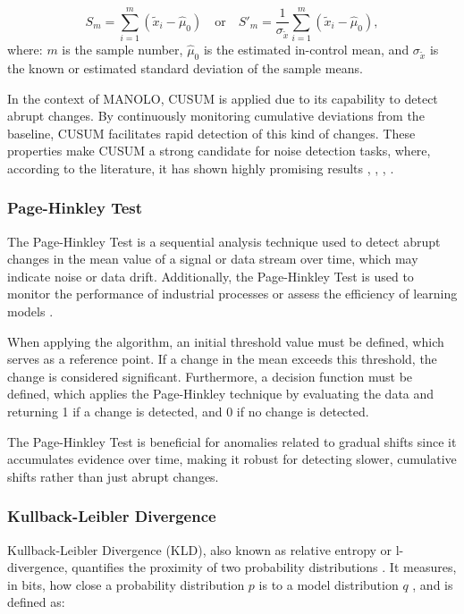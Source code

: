 \begin{equation}
S_m = \sum_{i=1}^{m} (\tilde{x}_i - \hat{\mu}_0) \quad \text{or} \quad S'_m = \frac{1}{\sigma_{\tilde{x}}} \sum_{i=1}^{m} (\tilde{x}_i - \hat{\mu}_0),
\end{equation}
where: $m$ is the sample number, $\hat{\mu}_0$ is the estimated in-control mean, and $\sigma_{\tilde{x}}$ is the known or estimated standard deviation of the sample means.

In the context of MANOLO, CUSUM is applied due to its capability to detect abrupt changes. By continuously monitoring cumulative deviations from the baseline, CUSUM facilitates rapid detection of this kind of changes.
These properties make CUSUM a strong candidate for noise detection tasks, where, according to the literature, it has shown highly promising results \cite{artyushenko2021modeling}, \cite{volovach2021detection}, \cite{tam2009theoretical}, \cite{yi2021adaptive}.

\subsubsection{Page-Hinkley Test}
The Page-Hinkley Test is a sequential analysis technique used to detect abrupt changes \cite{sebastiao2017supporting} in the mean value of a signal or data stream over time, which may indicate noise or data drift. Additionally, the Page-Hinkley Test is used to monitor the performance of industrial processes \cite{mouss2004test} or assess the efficiency of learning models \cite{ali2023understanding}.

When applying the algorithm, an initial threshold value must be defined, which serves as a reference point. If a change in the mean exceeds this threshold, the change is considered significant. Furthermore, a decision function must be defined, which applies the Page-Hinkley technique by evaluating the data and returning 1 if a change is detected, and 0 if no change is detected.

The Page-Hinkley Test is beneficial for anomalies related to gradual shifts since it accumulates evidence over time, making it robust for detecting slower, cumulative shifts rather than just abrupt changes.

\subsubsection{Kullback-Leibler Divergence}

Kullback-Leibler Divergence (KLD), also known as relative entropy or l-divergence, quantifies the proximity of two probability distributions \cite{joyce2011kullback}. It measures, in bits, how close a probability distribution \( p \) is to a model distribution \( q \) \cite{vanerven2014renyi}, and is defined as:

